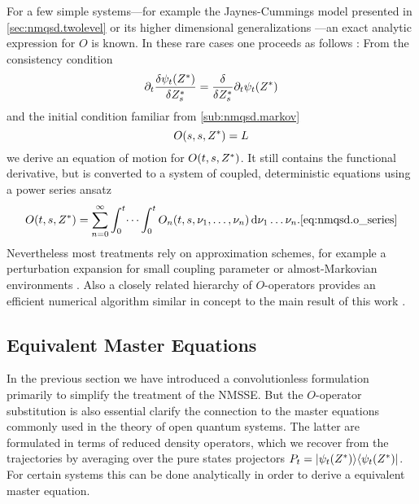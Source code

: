 For a few simple systems---for example the Jaynes-Cummings model presented in \autoref{sec:nmqsd.twolevel} or its higher dimensional generalizations \cite{JiZhYo12_exact_nmqsd}---an exact analytic expression for $O$ is known.
In these rare cases one proceeds as follows \cite{DiGiSt98_nmqsd}:
From the consistency condition
\begin{equation}
  \partial_t \frac{\delta \psi_t({Z}^*)}{\delta {Z}^*_s} = \frac{\delta}{\delta {Z}^*_s} \partial_t \psi_t({Z}^*)
  \label{eq:nmqsd.consistency_condition}
\end{equation}
and the initial condition familiar from \autoref{sub:nmqsd.markov}
\begin{equation}
  O(s, s, {Z}^*) = L
  \label{eq:nmqsd.o_initial}
\end{equation}
we derive an equation of motion for $O(t, s, {Z}^*)$.
It still contains the functional derivative, but is converted to a system of coupled, deterministic equations using a power series ansatz
\begin{equation}
  O(t, s, \ZZ) = \sum_{n=0}^\infty \int_0^t \dots \int_0^t O_n(t, s, \nu_1, \dots, \nu_n) \dd \nu_1 \dots \nu_n.
  \autoref{eq:nmqsd.o_series}
\end{equation}
Nevertheless most treatments rely on approximation schemes, for example a perturbation expansion for small coupling parameter or almost-Markovian environments \cite{YuDiGiSt99_pertubation}.
Also a closely related hierarchy of $O$-operators provides an efficient numerical algorithm similar in concept to the main result of this work \cite{}.

\subsection{Equivalent Master Equations}
\label{sub:nmqsd.lin_nmsse.master}

In the previous section we have introduced a convolutionless formulation primarily to simplify the treatment of the NMSSE\@.
But the $O$-operator substitution is also essential clarify the connection to the master equations commonly used in the theory of open quantum systems.
The latter are formulated in terms of reduced density operators, which we recover from the trajectories by averaging over the pure states projectors $P_t = | \psi_t({Z}^*) \rangle\langle \psi_t({Z}^*) |$.
For certain systems this can be done analytically in order to derive a equivalent master equation.

